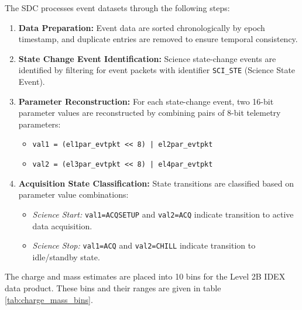 The SDC processes event datasets through the following steps:
\begin{enumerate}
  \item \textbf{Data Preparation:} Event data are sorted chronologically by epoch timestamp, and duplicate entries are removed to ensure temporal consistency.

  \item \textbf{State Change Event Identification:} Science state-change events are identified by filtering for event packets with identifier \texttt{SCI\_STE} (Science State Event).

  \item \textbf{Parameter Reconstruction:} For each state-change event, two 16-bit parameter values are reconstructed by combining pairs of 8-bit telemetry parameters:
  \begin{itemize}
    \item \texttt{val1 = (el1par\_evtpkt << 8) | el2par\_evtpkt}
    \item \texttt{val2 = (el3par\_evtpkt << 8) | el4par\_evtpkt}
  \end{itemize}

  \item \textbf{Acquisition State Classification:} State transitions are classified based on parameter value combinations:
  \begin{itemize}
    \item \emph{Science Start:} \texttt{val1=ACQSETUP} and \texttt{val2=ACQ} indicate transition to active data acquisition.
    \item \emph{Science Stop:} \texttt{val1=ACQ} and \texttt{val2=CHILL} indicate transition to idle/standby state.
  \end{itemize}
\end{enumerate}

The charge and mass estimates are placed into 10 bins for the Level 2B IDEX data product. These bins and their ranges are given in table \ref{tab:charge_mass_bins}.


